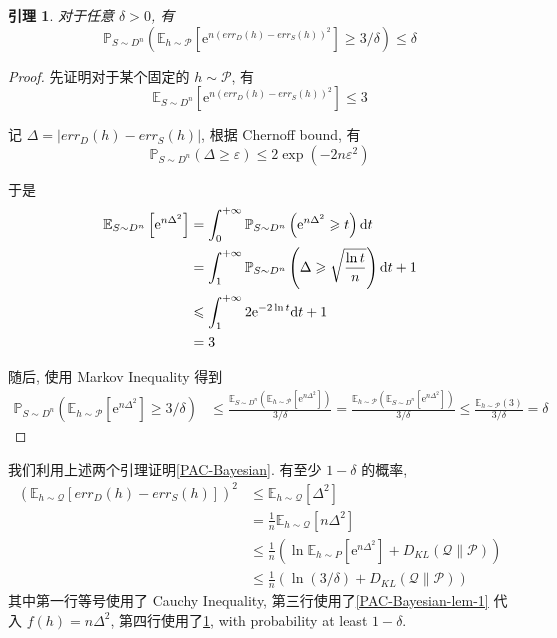 \documentclass[8pt]{article}
\theoremstyle{compact}
\newtheorem{lemma}[theorem]{引理}
\def\le{\leqslant}
\def\ge{\geqslant}
\def\e{\mathrm{e}}
\begin{document}
\begin{lemma}
	对于任意 $\delta > 0$, 有 $$\mathbb P_{S \sim D^n} \left(\mathbb E_{h \sim \mathcal P} [ \e^{n(err_D(h) - err_S(h))^2} ] \ge 3/\delta\right) \le \delta$$
	\label{PAC-Bayesian-lem-2}
\end{lemma}
\begin{proof}
	先证明对于某个固定的 $h \sim \mathcal P$, 有 $$\mathbb E_{S \sim D^n}[\e^{n(err_D(h) - err_S(h))^2}] \le 3$$

	记 $\Delta = |err_D(h) - err_S(h)|$, 根据 Chernoff bound, 有 $$\mathbb P_{S \sim D^n}(\Delta \ge \varepsilon) \le 2\exp(-2n\varepsilon^2)$$

	于是\begin{equation*}
		\begin{split}			
			\mathbb E_{S \sim D^n} \left[\e^{n\Delta^2}\right] &= \int_0^{+\infty}\mathbb P_{S \sim D^n}\left(\e^{n\Delta^2} \ge t\right) \text dt\\
			&= \int_1^{+\infty}\mathbb P_{S \sim D^n}\left(\Delta \ge \sqrt{\frac{\ln t}{n}}\right) \text dt + 1\\
			&\le \int_1^{+\infty}2\e^{-2\ln t}\text dt + 1\\
			&= 3
		\end{split}
	\end{equation*}

	随后, 使用 Markov Inequality 得到\begin{equation*}
		\begin{split}
			\mathbb P_{S \sim D^n} \left(\mathbb E_{h \sim \mathcal P} [ \e^{n\Delta^2} ] \ge 3/\delta\right) &\le \frac{\mathbb E_{S \sim D^n} \left(\mathbb E_{h \sim \mathcal P} [ \e^{n\Delta^2} ]\right)}{3/\delta} = \frac{ \mathbb E_{h \sim \mathcal P}\left(\mathbb E_{S \sim D^n} [ \e^{n\Delta^2} ]\right)}{3/\delta} \le \frac{ \mathbb E_{h \sim \mathcal P}\left(3\right)}{3/\delta} = \delta
		\end{split}
	\end{equation*}
\end{proof}

我们利用上述两个引理证明\cref{PAC-Bayesian}. 有至少 $1 - \delta$ 的概率, 
\begin{equation*}
	\begin{split}
		\left(\mathbb E_{h \sim \mathcal Q}[err_D(h) - err_S(h)]\right)^2
		& \le \mathbb E_{h \sim \mathcal Q}[\Delta^2]\\
		&= \frac1n \mathbb E_{h \sim \mathcal Q}[n\Delta^2]\\
		&\le \frac1n \left(\ln \mathbb E_{h \sim P}\left[\e^{n\Delta^2}\right] + D_{KL}(\mathcal Q \| \mathcal P)\right)\\
		&\le \frac1n \left(\ln(3/\delta) + D_{KL}(\mathcal Q \| \mathcal P)\right)
	\end{split}
\end{equation*}
其中第一行等号使用了 Cauchy Inequality, 第三行使用了\cref{PAC-Bayesian-lem-1} 代入 $f(h) = n\Delta^2$, 第四行使用了\cref{PAC-Bayesian-lem-2}, with probability at least $1 - \delta$.
\end{document}
